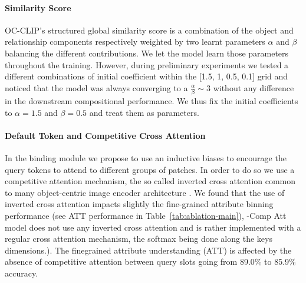 \paragraph{Similarity Score}
OC-CLIP's structured global similarity score is a combination of the object and relationship components respectively weighted by two learnt parameters $\alpha$ and $\beta$ balancing the different contributions. We let the model learn those parameters throughout the training. However, during preliminary experiments we tested a different combinations of initial coefficient within the [1.5, 1, 0.5, 0.1] grid and noticed that the model was always converging to a $\frac{\alpha}{\beta} \sim 3$ without any difference in the downstream compositional performance. We thus fix the initial coefficients to $\alpha=1.5$ and $\beta=0.5$ and treat them as parameters.

\paragraph{Default Token and Competitive Cross Attention}
In the binding module we propose to use an inductive biases to encourage the query tokens to attend to different groups of patches. In order to do so we use a competitive attention mechanism, the so called inverted cross attention common to many object-centric image encoder architecture \citep{locatello2020objectcentriclearningslotattention, WuInvertedAttentionTC}. We found that the use of inverted cross attention impacts slightly the fine-grained attribute binning performance (see ATT performance in Table~\ref{tab:ablation-main}), -Comp Att model does not use any inverted cross attention and is rather implemented with a regular cross attention mechanism, the softmax being done along the keys dimensions.). The finegrained attribute understanding (ATT) is affected by the absence of competitive attention between query slots going from 89.0\% to 85.9\% accuracy.

